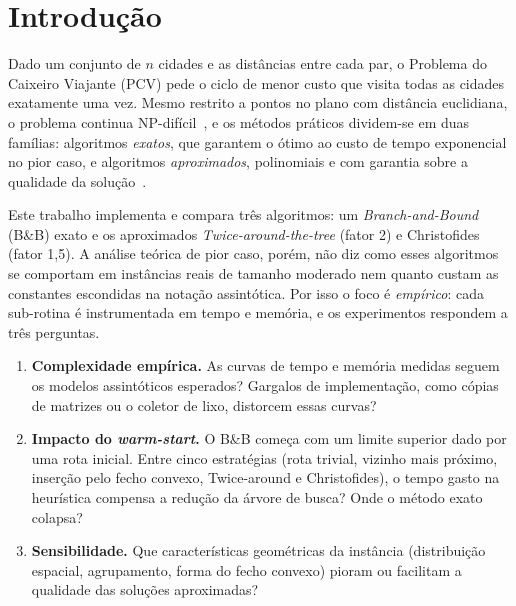 \section{Introdução}\label{sec:intro}

Dado um conjunto de $n$ cidades e as distâncias entre cada par, o Problema do Caixeiro
Viajante (PCV) pede o ciclo de menor custo que visita todas as cidades exatamente uma vez.
Mesmo restrito a pontos no plano com distância euclidiana, o problema continua
NP-difícil~\cite{papadimitriou1977}, e os métodos práticos dividem-se em duas famílias:
algoritmos \emph{exatos}, que garantem o ótimo ao custo de tempo exponencial no pior caso,
e algoritmos \emph{aproximados}, polinomiais e com garantia sobre a qualidade da
solução~\cite{applegate2006}.

Este trabalho implementa e compara três algoritmos: um \emph{Branch-and-Bound} (B\&B)
exato e os aproximados \emph{Twice-around-the-tree} (fator 2) e
Christofides~\cite{christofides1976} (fator 1{,}5). A análise teórica de pior caso,
porém, não diz como esses algoritmos se comportam em instâncias reais de tamanho moderado
nem quanto custam as constantes escondidas na notação assintótica. Por isso o foco é
\emph{empírico}: cada sub-rotina é instrumentada em tempo e memória, e os experimentos
respondem a três perguntas.
\begin{enumerate}
  \item \textbf{Complexidade empírica.} As curvas de tempo e memória medidas seguem os
    modelos assintóticos esperados? Gargalos de implementação, como cópias de matrizes ou o
    coletor de lixo, distorcem essas curvas?
  \item \textbf{Impacto do \emph{warm-start}.} O B\&B começa com um limite superior dado
    por uma rota inicial. Entre cinco estratégias (rota trivial, vizinho mais próximo,
    inserção pelo fecho convexo, Twice-around e Christofides), o tempo gasto na heurística
    compensa a redução da árvore de busca? Onde o método exato colapsa?
  \item \textbf{Sensibilidade.} Que características geométricas da instância
    (distribuição espacial, agrupamento, forma do fecho convexo) pioram ou facilitam a
    qualidade das soluções aproximadas?
\end{enumerate}

